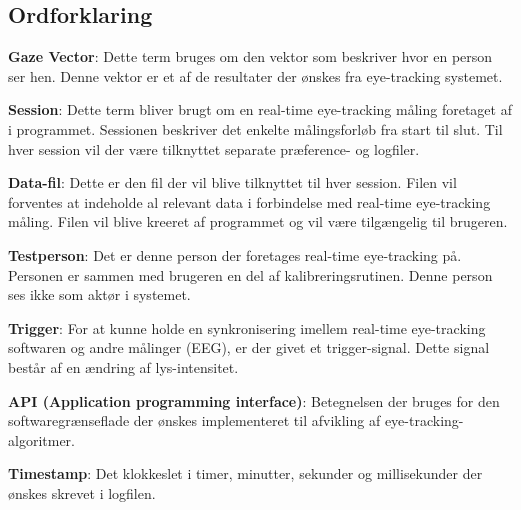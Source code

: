 \documentclass[rapport.tex]{subfiles}
\begin{document}
	\subsection{Ordforklaring}
		\item \textbf{Gaze Vector}: Dette term bruges om den vektor som beskriver hvor en person ser hen. Denne vektor er et af de resultater der ønskes fra eye-tracking systemet.
		\item \textbf{Session}: Dette term bliver brugt om en real-time eye-tracking måling foretaget af i programmet. Sessionen beskriver det enkelte målingsforløb fra start til slut. Til hver session vil der være tilknyttet separate præference- og logfiler. 
		\item \textbf{Data-fil}: Dette er den fil der vil blive tilknyttet til hver session. Filen vil forventes at indeholde al relevant data i forbindelse med real-time eye-tracking måling. Filen vil blive kreeret af programmet og vil være tilgængelig til brugeren. 
		\item \textbf{Testperson}: Det er denne person der foretages real-time eye-tracking på. Personen er sammen med brugeren en del af kalibreringsrutinen. Denne person ses ikke som aktør i systemet. 
		\item \textbf{Trigger}: For at kunne holde en synkronisering imellem real-time eye-tracking softwaren og andre målinger (EEG), er der givet et trigger-signal. Dette signal består af en ændring af lys-intensitet. 
		\item \textbf{API (Application programming interface)}: Betegnelsen der bruges for den softwaregrænseflade der ønskes implementeret til afvikling af eye-tracking-algoritmer. 
		\item \textbf{Timestamp}: Det klokkeslet i timer, minutter, sekunder og millisekunder der ønskes skrevet i logfilen. 
\end{document}
